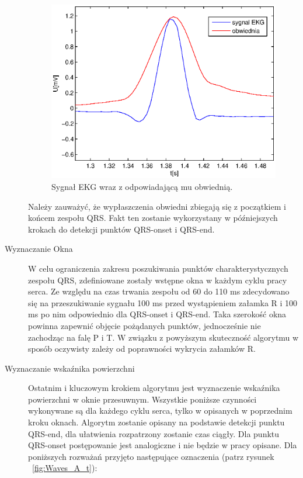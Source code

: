 \begin{description}
\begin{figure}[h]
\centering
\includegraphics[scale=0.7] {Waves/img/Envelope.eps}
\caption{Sygnał EKG wraz z odpowiadającą mu obwiednią.}
\label{fig:Waves_ENV}
\end{figure}

Należy zauważyć, że wypłaszczenia obwiedni zbiegają się z początkiem i końcem zespołu QRS. Fakt ten zostanie wykorzystany w późniejszych krokach do detekcji punktów QRS-onset i QRS-end.

\item[Wyznaczanie Okna]
W celu ograniczenia zakresu poszukiwania punktów charakterystycznych zespołu QRS, zdefiniowane zostały wstępne okna w każdym cyklu pracy serca. Ze względu na czas trwania zespołu od 60 do 110 ms zdecydowano się na przeszukiwanie sygnału 100 ms przed wystąpieniem załamka R i 100 ms po nim odpowiednio dla QRS-onset i QRS-end. Taka szerokość okna powinna zapewnić objęcie pożądanych punktów, jednocześnie nie zachodząc na falę P i T. W związku z powyższym skuteczność algorytmu w sposób oczywisty zależy od poprawności wykrycia załamków R.

\item[Wyznaczanie wskaźnika powierzchni]
 Ostatnim i kluczowym krokiem algorytmu jest wyznaczenie wskaźnika powierzchni w oknie przesuwnym. Wszystkie poniższe czynności wykonywane są dla każdego cyklu serca, tylko w opisanych w poprzednim kroku oknach. Algorytm zostanie opisany na podstawie detekcji punktu QRS-end, dla ułatwienia rozpatrzony zostanie czas ciągły. Dla punktu QRS-onset postępowanie jest analogiczne i nie będzie w pracy opisane. Dla poniższych rozważań przyjęto następujące oznaczenia (patrz rysunek ~\ref{fig:Waves_A_t}):



\end{description}
